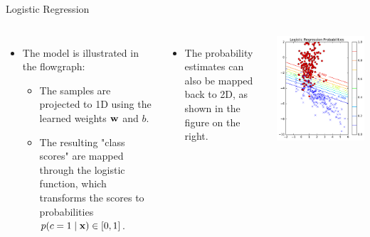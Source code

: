 \documentclass[10pt, aspectratio=169]{beamer} %
\newcommand{\w}{{\bf w}}
\newcommand{\x}{{\bf x}}
\begin{document}
\begin{frame}{Logistic Regression}
\begin{columns}[onlytextwidth]
\begin{itemize}
\item The model is illustrated in the flowgraph:
\begin{itemize}
	\item The samples are projected to 1D using the learned weights $\w$ and $b$.
	\item The resulting "class scores" are mapped through the logistic function,
	which transforms the scores to probabilities $p(c = 1 \mid \x)\in[0,1]$.
\end{itemize}
\end{itemize}
\begin{columns}[onlytextwidth]
\begin{itemize}
	\item The probability estimates can also be mapped back to 2D,
	as shown in the figure on the right.
\end{itemize}
\vspace*{2cm}
	\includegraphics[width=\textwidth]{LR_prob_2D.pdf}

\end{columns}
\end{columns}
\end{frame}
\end{document}
